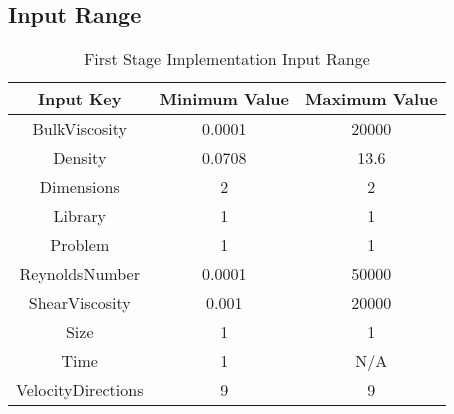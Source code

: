 \documentclass[12pt, titlepage]{article}
\begin{document}
~\newpage
\subsection{Input Range}
\label{inrange}
\begin{table}[!h]
	\begin{center}
		\begin{tabular}{| c | c | c |}
			\hline
			\textbf{Input Key} & \textbf{Minimum Value} & \textbf{Maximum Value}\\
			\hline
			BulkViscosity & 0.0001 & 20000 \\
			\hline
			Density & 0.0708 & 13.6 \\
			\hline
			Dimensions & 2 & 2 \\
			\hline
			Library & 1 & 1\\
			\hline
			Problem & 1 & 1\\
			\hline
			ReynoldsNumber & 0.0001 & 50000\\
			\hline
			ShearViscosity & 0.001 & 20000\\
			\hline
			Size & 1 & 1\\
			\hline
			Time & 1 & N/A\\
			\hline
			VelocityDirections & 9 & 9\\
			\hline
		\end{tabular}
		\caption{First Stage Implementation Input Range}
		\label{table:fstageiminrange}
	\end{center}
\end{table}
\end{document}
